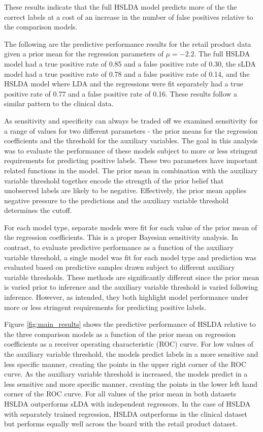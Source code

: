 These results indicate that the full HSLDA model predicts more of the the
correct labels at a cost of an increase in the number of false positives
relative to the comparison models.

The following are the predictive performance results for the retail product
data given a prior mean for the regression parameters of $\mu=-2.2$. 
The full HSLDA model had a true positive rate of 0.85 
and a false positive rate of 0.30, the sLDA model had a true positive
rate of 0.78 and a false positive rate of 0.14, and the HSLDA model where
LDA and the regressions were fit separately had a true positive rate of 0.77
and a false positive rate of 0.16. These results follow a similar pattern to the clinical data.

As sensitivity and specificity can always be traded off we examined sensitivity for a range of values
for two different parameters - the prior means for the regression coefficients
and the threshold for the auxiliary variables.  The goal in this analysis
was to evaluate the performance of these models subject to more or less
stringent requirements for predicting positive labels. These two parameters 
have important related functions in the model. The prior mean in combination 
with the auxiliary variable threshold together encode the strength of the prior
belief that unobserved labels are likely to be negative. Effectively, the
prior mean applies negative pressure to the predictions and the auxiliary
variable threshold determines the cutoff.

For each model type, separate models were fit for each value of the 
prior mean of the regression coefficients.  This is a proper Bayesian
sensitivity analysis. In contrast, to evaluate
predictive performance as a function of the auxiliary variable threshold,
a single model was fit for each model type and prediction was evaluated
based on predictive samples drawn subject to different auxiliary variable
thresholds. These methods are significantly different since the prior mean
is varied prior to inference and the auxiliary variable threshold is varied
following inference.  However, as intended, they both highlight model performance
under more or less stringent requirements for predicting positive labels.

Figure \ref{fig:main_results} shows the predictive performance of HSLDA 
relative to the three comparison models as a function of the prior mean
on regression coefficients as a receiver operating characteristic (ROC) curve. 
For low values of the auxiliary variable
threshold, the models predict labels in a more sensitive and less specific
manner, creating the points in the upper right corner of the ROC curve. As
the auxiliary variable threshold is increased, the models predict in a less
sensitive and more specific manner, creating the points in the lower left
hand corner of the ROC curve. For all values of the prior mean in both datasets
HSLDA outperforms sLDA with independent regressors. In the case of HSLDA with
separately trained regression, HSLDA outperforms in the clinical dataset but
performs equally well across the board with the retail product dataset.

